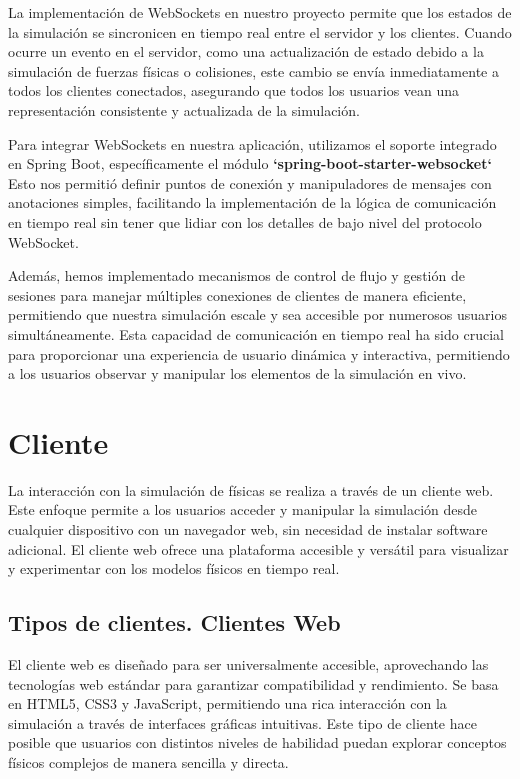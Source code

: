 La implementación de WebSockets en nuestro proyecto permite que los estados de la simulación se sincronicen en tiempo real entre el servidor y los clientes. Cuando ocurre un evento en el servidor, como una actualización de estado debido a la simulación de fuerzas físicas o colisiones, este cambio se envía inmediatamente a todos los clientes conectados, asegurando que todos los usuarios vean una representación consistente y actualizada de la simulación.

Para integrar WebSockets en nuestra aplicación, utilizamos el soporte integrado en Spring Boot, específicamente el módulo \textbf{`spring-boot-starter-websocket`} Esto nos permitió definir puntos de conexión y manipuladores de mensajes con anotaciones simples, facilitando la implementación de la lógica de comunicación en tiempo real sin tener que lidiar con los detalles de bajo nivel del protocolo WebSocket.

Además, hemos implementado mecanismos de control de flujo y gestión de sesiones para manejar múltiples conexiones de clientes de manera eficiente, permitiendo que nuestra simulación escale y sea accesible por numerosos usuarios simultáneamente. Esta capacidad de comunicación en tiempo real ha sido crucial para proporcionar una experiencia de usuario dinámica y interactiva, permitiendo a los usuarios observar y manipular los elementos de la simulación en vivo.


\section{Cliente}

La interacción con la simulación de físicas se realiza a través de un cliente web. Este enfoque permite a los usuarios acceder y manipular la simulación desde cualquier dispositivo con un navegador web, sin necesidad de instalar software adicional. El cliente web ofrece una plataforma accesible y versátil para visualizar y experimentar con los modelos físicos en tiempo real.

\subsection{Tipos de clientes. Clientes Web}
El cliente web es diseñado para ser universalmente accesible, aprovechando las tecnologías web estándar para garantizar compatibilidad y rendimiento. Se basa en HTML5, CSS3 y JavaScript, permitiendo una rica interacción con la simulación a través de interfaces gráficas intuitivas. Este tipo de cliente hace posible que usuarios con distintos niveles de habilidad puedan explorar conceptos físicos complejos de manera sencilla y directa.

